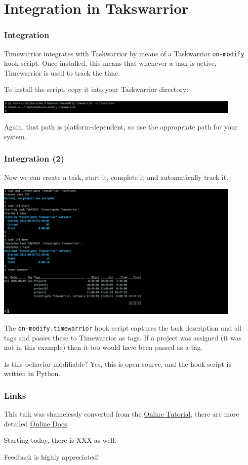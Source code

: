 \documentclass[t,handout]{beamer}
\begin{document}
\section{Integration in Takswarrior}

\begin{frame}[fragile]\frametitle{Integration}
    Timewarrior integrates with Taskwarrior by means of a Taskwarrior \verb=on-modify= hook script. Once installed, this means that whenever a task is active, Timewarrior is used to track the time.

    To install the script, copy it into your Taskwarrior directory:

    \includegraphics[width=12cm]{images/tutorial49.png}

    Again, that path is platform-dependent, so use the appropriate path for your system.
\end{frame}

\begin{frame}[fragile]\frametitle{Integration (2)}
    Now we can create a task, start it, complete it and automatically track it.

    \includegraphics[width=12cm]{images/tutorial50.png}

    The \verb=on-modify.timewarrior= hook script captures the task description and all tags and passes these to Timewarrior as tags. If a project was assigned (it was not in this example) then it too would have been passed as a tag.

    Is this behavior modifiable?  Yes, this is open source, and the hook script is written in Python.
\end{frame}

\begin{frame}[fragile]\frametitle{Links}
    This talk was shamelessly converted from the \href{https://taskwarrior.org/docs/timewarrior/tutorial.html}{Online Tutorial}, there are more detailed \href{https://taskwarrior.orgdocs/timewarrior/index.html}{Online Docs}.

    Starting today, there is XXX as well.

    Feedback is highly appreciated!
\end{frame}
\end{document}
